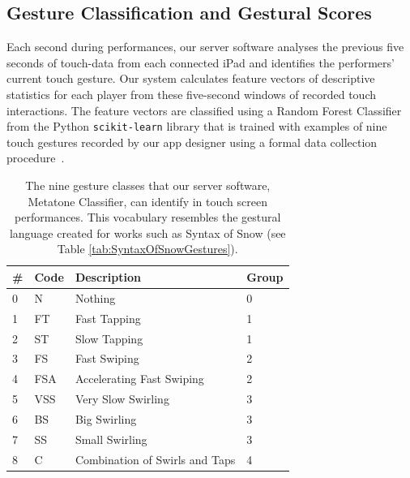 \documentclass[graybox]{svmult}
\begin{document}
\subsection{Gesture Classification and Gestural Scores}
\label{subsec:gesture-classification}

Each second during performances, our server software analyses the
previous five seconds of touch-data from each connected iPad and
identifies the performers' current touch gesture. Our system
calculates feature vectors of descriptive statistics for each player
from these five-second windows of recorded touch interactions. The
feature vectors are classified using a Random Forest
Classifier~\cite{Breiman:2001kx} from the Python \texttt{scikit-learn}
library that is trained with examples of nine touch gestures recorded
by our app designer using a formal data collection
procedure~\cite{Martin:2015jk}. 

\begin{table}
\begin{center}
    \begin{tabular}{|l|l|l|l|}
    \hline
    \# & Code & Description & Group \\ \hline
    0 & N   & Nothing & 0 \\
    1 & FT  & Fast Tapping & 1\\
    2 & ST  & Slow Tapping & 1\\
    3 & FS  & Fast Swiping & 2\\
    4 & FSA & Accelerating Fast Swiping & 2\\
    5 & VSS & Very Slow Swirling & 3\\
    6 & BS  & Big Swirling & 3\\
    7 & SS  & Small Swirling & 3\\
    8 & C   & Combination of Swirls and Taps & 4\\ \hline
    \end{tabular}
\end{center}
\caption{The nine gesture classes that our server software, Metatone
  Classifier, can identify in touch screen performances. This
  vocabulary resembles the gestural language created for works such as
  Syntax of Snow (see Table \ref{tab:SyntaxOfSnowGestures}).}
\label{tab:gesture-classes}
\end{table}
\end{document}
